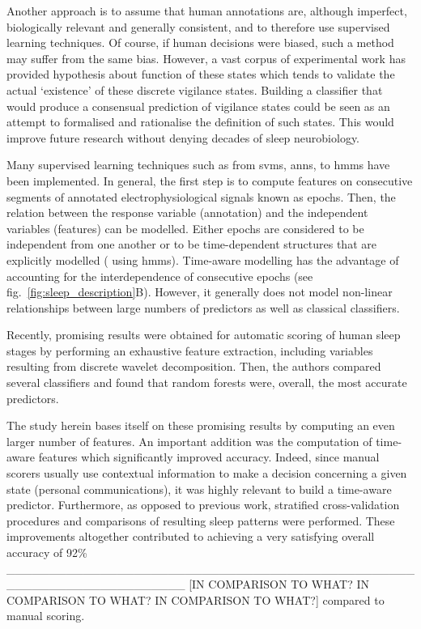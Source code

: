 Another approach is to assume that human annotations are, although imperfect, biologically relevant and generally consistent,
 and to therefore use supervised learning
 techniques\cite{crisler_sleep-stage_2008,ventouras_performance_2012,doroshenkov_classification_2007,pan_transition-constrained_2012,sen_comparative_2014}.
  Of course, if human decisions were biased, such a method may suffer from the same bias.
However, a vast corpus of experimental work has provided hypothesis about function of these states which tends to validate the actual `existence' of these discrete vigilance states\cite{diekelmann_memory_2010}.
Building a classifier that would produce a consensual prediction of vigilance states could be seen as an attempt to formalised and rationalise the definition of such states.
This would improve future research without denying decades of sleep neurobiology.

Many supervised learning techniques such as from
\glspl{svm}\cite{crisler_sleep-stage_2008},
\glspl{ann}\cite{ventouras_performance_2012},
to
\glspl{hmm}\cite{doroshenkov_classification_2007,pan_transition-constrained_2012} have been implemented.
In general, the first step is to compute features on consecutive segments of annotated electrophysiological signals known as epochs.
Then, the relation between the response variable (annotation) and the independent variables (features) can be modelled.
Either epochs are considered to be independent from one another or to be time-dependent structures that are explicitly modelled (\eg{} using \glspl{hmm}).
Time-aware modelling has the advantage of accounting for the interdependence of consecutive epochs (see fig.~\ref{fig:sleep_description}B).
However, it generally does not model non-linear relationships between large numbers of predictors as well as classical classifiers.

Recently, promising results were obtained for automatic scoring of human sleep stages by performing an exhaustive
feature extraction, including variables resulting from discrete wavelet
decomposition\cite{sen_comparative_2014}.
Then, the authors compared several classifiers and found that random
forests\cite{breiman_random_2001} were, overall, the most accurate predictors.

The study herein bases itself on these promising results by computing an even larger number of features.
An important addition was the computation of time-aware
features\cite{dietterich_machine_2002,deng_time_2013} which significantly improved
accuracy. 
Indeed, since manual scorers usually use contextual information to make a decision concerning a given state (personal communications),
it was highly relevant to build a time-aware predictor.
Furthermore, as opposed to previous work, stratified cross-validation\cite{ding_querying_2008} procedures and
comparisons of resulting sleep patterns were performed.
These improvements altogether contributed to achieving a very satisfying overall accuracy of 92\% 
_____________________________________________________________________
[IN COMPARISON TO WHAT? IN COMPARISON TO WHAT? IN COMPARISON TO WHAT?] compared to manual scoring.


